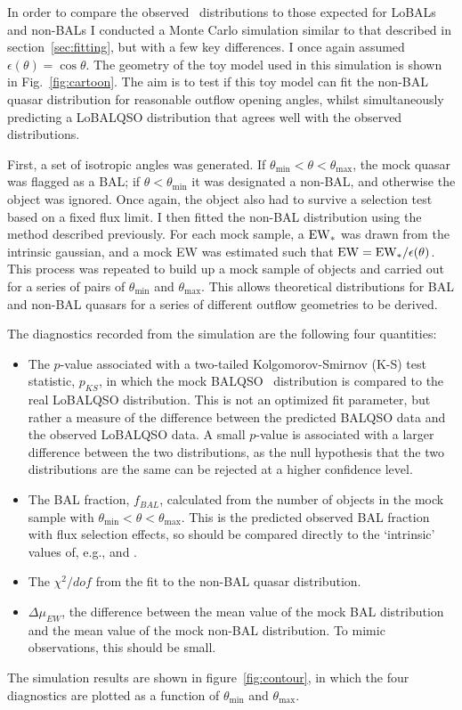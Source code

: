 In order to compare the observed \ewo\ distributions to those expected for LoBALs and
non-BALs I conducted a Monte Carlo simulation similar to
that described in section~\ref{sec:fitting}, but with a few 
key differences. I once again assumed $\epsilon(\theta) = \cos \theta$.
The geometry of the toy model used in this simulation is shown in
Fig.~\ref{fig:cartoon}. The aim is to test if this toy model can 
fit the non-BAL quasar distribution for reasonable outflow opening angles,
whilst simultaneously predicting a LoBALQSO distribution that agrees well with
the observed distributions.

First, a set of isotropic angles was generated.
If $\theta_{\mathrm{min}}<\theta<\theta_{\mathrm{max}}$, the mock quasar
was flagged as a BAL; if $\theta<\theta_{\mathrm{min}}$ it 
was designated a non-BAL, and otherwise
the object was ignored. Once again, the object also had to 
survive a selection test based on a fixed flux limit.
I then fitted the non-BAL distribution using the method described previously.
For each mock sample, a ${\rm EW}_*$ was drawn from the intrinsic gaussian,
and a mock EW was estimated such that ${\rm EW} = {\rm EW}_* / \epsilon(\theta)$.
This process was repeated to build up a mock sample of objects and 
carried out for a series of pairs of $\theta_{\mathrm{min}}$ and $\theta_{\mathrm{max}}$.
This allows theoretical distributions for BAL and non-BAL quasars
for a series of different outflow geometries to be derived.

The diagnostics recorded from the simulation are the following four
quantities:
\begin{itemize}
	\item The $p$-value associated with a two-tailed Kolgomorov-Smirnov (K-S) 
	test statistic, $p_{KS}$, in which the mock BALQSO \ewo\ distribution is compared
	to the real LoBALQSO distribution. This is not an optimized fit parameter, but rather a measure of
	the difference between the predicted BALQSO data and the observed LoBALQSO data. A small $p$-value
	is associated with a larger difference between the two distributions, as the null hypothesis that
	the two distributions are the same can be rejected at a higher confidence level.
	\item The BAL fraction, $f_{BAL}$, calculated from the 
	number of objects in the mock sample with $\theta_{\mathrm{min}}<\theta<\theta_{\mathrm{max}}$.
	This is the predicted observed BAL fraction with flux selection effects, so should be compared
	directly to the `intrinsic' values of, e.g., \cite{knigge2008} and \cite{allen2011}.
	\item The $\chi^2/dof$ from the fit to the non-BAL quasar distribution.
	\item $\Delta \mu_{EW}$, the difference between the mean value of the mock BAL
	distribution and the mean value of the mock non-BAL distribution. To mimic observations,
	this should be small.
\end{itemize}
The simulation results are shown in figure~\ref{fig:contour}, in which the 
four diagnostics are plotted as a function of $\theta_{\mathrm{min}}$ 
and $\theta_{\mathrm{max}}$. 

